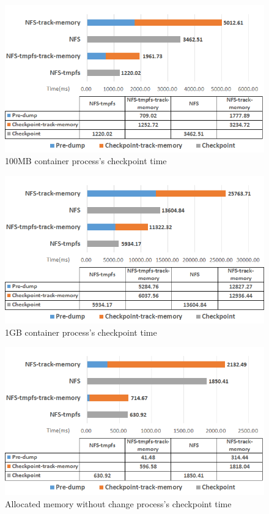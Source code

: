 \begin{figure}[hbtp]
\begin{center}
\includegraphics[width=14cm]{figure/100MB.png}
\end{center}
\caption{100MB container process's checkpoint time}
\label{fig:100MB}
\end{figure}

\begin{figure}[hbtp]
\begin{center}
\includegraphics[width=14cm]{figure/1GB.png}
\end{center}
\caption{1GB container process's checkpoint time}
\label{fig:1GB}
\end{figure}

\begin{figure}[hbtp]
\begin{center}
\includegraphics[width=14cm]{figure/allocate_mem_without_change.png}
\end{center}
\caption{Allocated memory without change process's checkpoint time}
\label{fig:allocate memory}
\end{figure}

